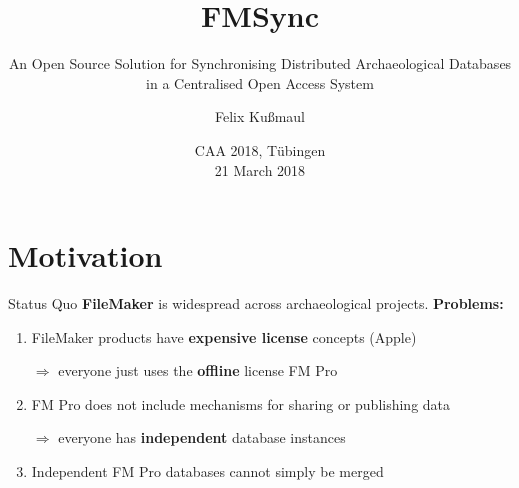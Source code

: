 \documentclass[xcolor=x11names, aspectratio=169,usenames,dvipsnames]{beamer}
\author[Felix Kußmaul]{\large Felix Kußmaul\inst{1}}
\title[FMSync]{\Large FMSync}
\subtitle{\normalsize An Open Source Solution for Synchronising Distributed Archaeological Databases in a Centralised Open Access System}
\institute[Cologne]{\inst{1} Archaeological Institute, University of Cologne}
\date[\today]{\vspace*{1em}CAA 2018, Tübingen\\[.5em] 21 March 2018\vspace*{1em}}
\begin{document}
\begin{frame}[plain]
\titlepage
\end{frame}

\section{Motivation}

\begin{frame}{Status Quo}\large
\textbf{FileMaker} is widespread across archaeological projects. \alert{\textbf{Problems:}}
\begin{enumerate}[<+->]
\item FileMaker products have \textbf{expensive license} concepts (Apple)\pause

$\Rightarrow$ everyone just uses the \textbf{offline} license FM Pro
\item FM Pro does not include mechanisms for sharing or publishing data\pause

$\Rightarrow$ everyone has \textbf{independent} database instances
\item Independent FM Pro databases cannot simply be merged
\end{enumerate}
\end{frame}
\end{document}
